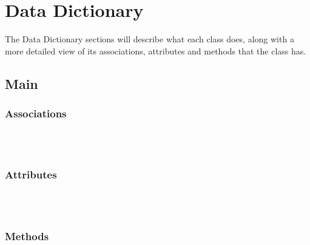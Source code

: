 \section{Data Dictionary}
The Data Dictionary sections will describe what each class does, along with a more detailed view of its
associations, attributes and methods that the class has.

\subsection{Main}

\subsubsection{Associations}
\textbf{} \\

\textbf{} \\

\subsubsection{Attributes}
\textbf{} \\

\textbf{} \\

\subsubsection{Methods}
\textbf{} \\
  
\textbf{} \\

